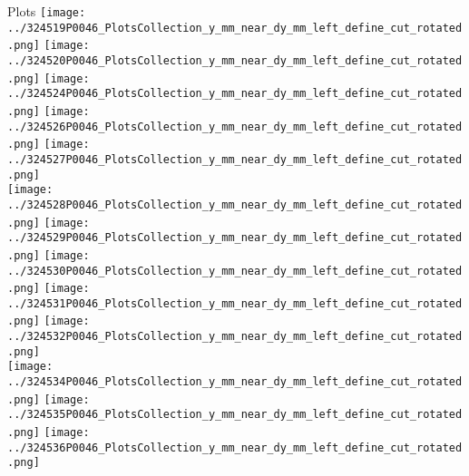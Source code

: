 \documentclass{beamer}
\begin{document}
\begin{frame}
\begin{block}{Plots}
                \texttt{[image: ../324519P0046\_PlotsCollection\_y\_mm\_near\_dy\_mm\_left\_define\_cut\_rotated.png]}
                \texttt{[image: ../324520P0046\_PlotsCollection\_y\_mm\_near\_dy\_mm\_left\_define\_cut\_rotated.png]}
                \texttt{[image: ../324524P0046\_PlotsCollection\_y\_mm\_near\_dy\_mm\_left\_define\_cut\_rotated.png]}
                \texttt{[image: ../324526P0046\_PlotsCollection\_y\_mm\_near\_dy\_mm\_left\_define\_cut\_rotated.png]}
                \texttt{[image: ../324527P0046\_PlotsCollection\_y\_mm\_near\_dy\_mm\_left\_define\_cut\_rotated.png]}\\
                \texttt{[image: ../324528P0046\_PlotsCollection\_y\_mm\_near\_dy\_mm\_left\_define\_cut\_rotated.png]}
                \texttt{[image: ../324529P0046\_PlotsCollection\_y\_mm\_near\_dy\_mm\_left\_define\_cut\_rotated.png]}
                \texttt{[image: ../324530P0046\_PlotsCollection\_y\_mm\_near\_dy\_mm\_left\_define\_cut\_rotated.png]}
                \texttt{[image: ../324531P0046\_PlotsCollection\_y\_mm\_near\_dy\_mm\_left\_define\_cut\_rotated.png]}
                \texttt{[image: ../324532P0046\_PlotsCollection\_y\_mm\_near\_dy\_mm\_left\_define\_cut\_rotated.png]}\\
                \texttt{[image: ../324534P0046\_PlotsCollection\_y\_mm\_near\_dy\_mm\_left\_define\_cut\_rotated.png]}
                \texttt{[image: ../324535P0046\_PlotsCollection\_y\_mm\_near\_dy\_mm\_left\_define\_cut\_rotated.png]}
                \texttt{[image: ../324536P0046\_PlotsCollection\_y\_mm\_near\_dy\_mm\_left\_define\_cut\_rotated.png]}

        \end{block}
\end{frame}
\end{document}
